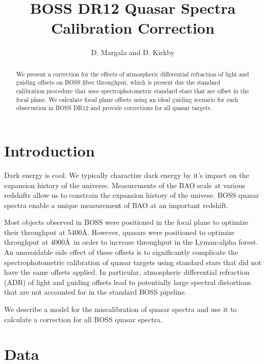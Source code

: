 \documentclass{emulateapj}
\begin{document}
\title{BOSS DR12 Quasar Spectra Calibration Correction}

\author{D. Margala and D. Kirkby}

\begin{abstract}
We present a correction for the effects of atmospheric differential refraction of light and guiding offsets on BOSS fiber throughput, which is present due the standard calibration procedure that uses spectrophotometric standard stars that are offset in the focal plane. We calculate focal plane offsets using an ideal guiding scenario for each observation in BOSS DR12 and provide corrections for all quasar targets.
\end{abstract}


\section{Introduction}

Dark energy is cool. We typically charactize dark energy by it's impact on the expansion history of the universe. Measurements of the BAO scale at various redshifts allow us to constrain the expansion history of the univese. BOSS quasar spectra enable a unique measurement of BAO at an important redshift.

Most objects observed in BOSS were positioned in the focal plane to optimize their throughput at 5400\AA. However, quasars were positioned to optimize throughput at 4000\AA~in order to increase throughput in the Lyman-alpha forest. An unavoidable side effect of these offsets is to significantly complicate the spectrophotometric calibration of quasar targets using standard stars that did not have the same offsets applied. In particular, atmospheric differential refraction (ADR) of light and guiding offsets lead to potentially large spectral distortions that are not accounted for in the standard BOSS pipeline.

We describe a model for the miscalibration of quasar spectra and use it to calculate a correction for all BOSS quasar spectra.

\section{Data}
\end{document}

